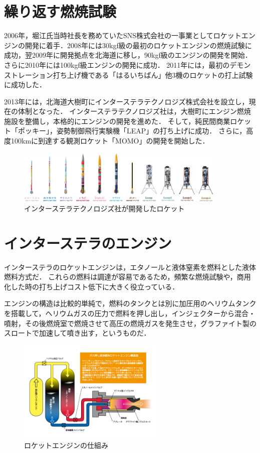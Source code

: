 \section{繰り返す燃焼試験}
2006年，堀江氏当時社長を務めていたSNS株式会社の一事業としてロケットエンジンの開発に着手．2008年には30kgf級の最初のロケットエンジンの燃焼試験に成功，翌2009年に開発拠点を北海道に移し，90kgf級のエンジンの開発を開始．さらに2010年には100kgf級エンジンの開発に成功．
2011年には，最初のデモンストレーション打ち上げ機である「はるいちばん」他3機のロケットの打上試験に成功した．


2013年には，北海道大樹町にインターステラテクノロジズ株式会社を設立し，現在の体制となった．
インターステラテクノロジズ社は，大樹町にエンジン燃焼施設を整備し，本格的にエンジンの開発を進めた．
そして，純民間商業ロケット「ポッキー」，姿勢制御飛行実験機「LEAP」の打ち上げに成功．
さらに，高度100kmに到達する観測ロケット「MOMO」の開発を開始した．

\begin{figure}[htbp]
\centering
\includegraphics[width=10cm]{img/istellartech-rockets.jpg}
\caption{インターステラテクノロジズ社が開発したロケット}
\end{figure}

\section{インターステラのエンジン}
インターステラのロケットエンジンは，エタノールと液体窒素を燃料とした液体燃料方式だ．
これらの燃料は調達が容易であるため，頻繁な燃焼試験や，商用化した時の打ち上げコスト低下に大きく役立っている．


エンジンの構造は比較的単純で，燃料のタンクとは別に加圧用のヘリウムタンクを搭載して，ヘリウムガスの圧力で燃料を押し出し，インジェクターから混合・噴射，その後燃焼室で燃焼させて高圧の燃焼ガスを発生させ，グラファイト製のスロートで加速して噴き出す，というものだ．
\begin{figure}[htbp]
\centering
\includegraphics[width=7cm]{img/momo-engine.png}
\caption{ロケットエンジンの仕組み}
\end{figure}

